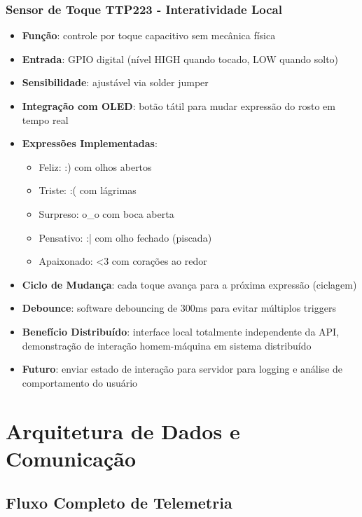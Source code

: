 \documentclass[12pt,a4paper,oneside]{report}
\begin{document}
\subsection{Sensor de Toque TTP223 - Interatividade Local}
\begin{itemize}[leftmargin=1.2cm]
    \item \textbf{Função}: controle por toque capacitivo sem mecânica física
    \item \textbf{Entrada}: GPIO digital (nível HIGH quando tocado, LOW quando solto)
    \item \textbf{Sensibilidade}: ajustável via solder jumper
    \item \textbf{Integração com OLED}: botão tátil para mudar expressão do rosto em tempo real
    \item \textbf{Expressões Implementadas}:
    \begin{itemize}
        \item Feliz: :) com olhos abertos
        \item Triste: :( com lágrimas
        \item Surpreso: o\_o com boca aberta
        \item Pensativo: :| com olho fechado (piscada)
        \item Apaixonado: <3 com corações ao redor
    \end{itemize}
    \item \textbf{Ciclo de Mudança}: cada toque avança para a próxima expressão (ciclagem)
    \item \textbf{Debounce}: software debouncing de 300ms para evitar múltiplos triggers
    \item \textbf{Benefício Distribuído}: interface local totalmente independente da API, demonstração de interação homem-máquina em sistema distribuído
    \item \textbf{Futuro}: enviar estado de interação para servidor para logging e análise de comportamento do usuário
\end{itemize}

\chapter{Arquitetura de Dados e Comunicação}

\section{Fluxo Completo de Telemetria}
\end{document}
